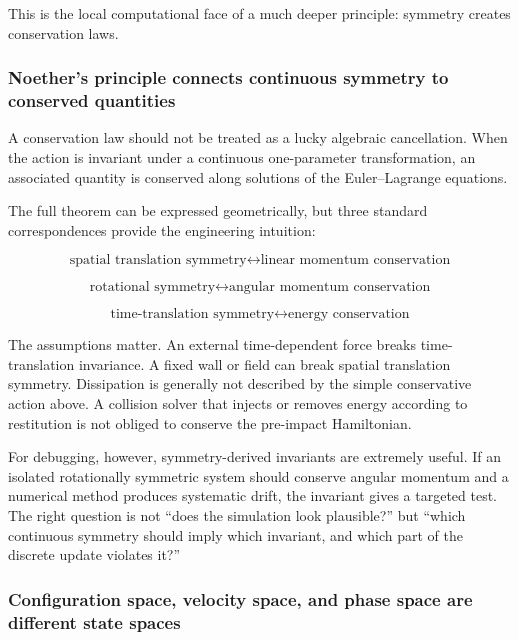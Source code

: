 This is the local computational face of a much deeper principle: symmetry creates conservation laws.

\subsubsection{Noether's principle connects continuous symmetry to conserved quantities}\label{02-foundations-ii-ch025-noethers-principle-connects-continuous-symmetry-to-conserved-quantities}

\hypertarget{02-foundations-ii-ch025-noethers-principle-connects-continuous-symmetry-to-conserved-quantities}{}

A conservation law should not be treated as a lucky algebraic cancellation. When the action is invariant under a continuous one-parameter transformation, an associated quantity is conserved along solutions of the Euler--Lagrange equations.

The full theorem can be expressed geometrically, but three standard correspondences provide the engineering intuition:

\[
\boxed{
\text{spatial translation symmetry}
\longleftrightarrow
\text{linear momentum conservation}
}
\]

\[
\boxed{
\text{rotational symmetry}
\longleftrightarrow
\text{angular momentum conservation}
}
\]

\[
\boxed{
\text{time-translation symmetry}
\longleftrightarrow
\text{energy conservation}
}
\]

The assumptions matter. An external time-dependent force breaks time-translation invariance. A fixed wall or field can break spatial translation symmetry. Dissipation is generally not described by the simple conservative action above. A collision solver that injects or removes energy according to restitution is not obliged to conserve the pre-impact Hamiltonian.

For debugging, however, symmetry-derived invariants are extremely useful. If an isolated rotationally symmetric system should conserve angular momentum and a numerical method produces systematic drift, the invariant gives a targeted test. The right question is not ``does the simulation look plausible?'' but ``which continuous symmetry should imply which invariant, and which part of the discrete update violates it?''

\subsubsection{Configuration space, velocity space, and phase space are different state spaces}\label{02-foundations-ii-ch025-configuration-space-velocity-space-and-phase-space-are-different-state-spaces}


